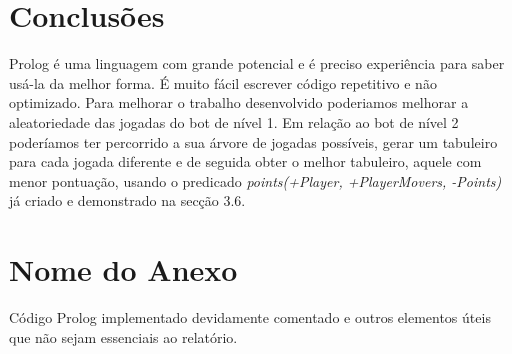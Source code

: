 \documentclass[a4paper]{article}
\begin{document}
\section{Conclusões}
Prolog é uma linguagem com grande potencial e é preciso experiência para saber usá-la da melhor forma. É muito fácil escrever código repetitivo e não optimizado.
Para melhorar o trabalho desenvolvido poderiamos melhorar a aleatoriedade das jogadas do bot de nível 1. Em relação ao bot de nível 2 poderíamos ter percorrido a sua árvore de jogadas possíveis, gerar um tabuleiro para cada jogada diferente e de seguida obter o melhor tabuleiro, aquele com menor pontuação, usando o predicado \textit{points(+Player, +PlayerMovers, -Points)}  já criado e demonstrado na secção 3.6.


\clearpage
{}
\renewcommand\refname{Bibliografia}



\newpage
\appendix
\section{Nome do Anexo}
Código Prolog implementado devidamente comentado e outros elementos úteis que não sejam essenciais ao relatório.
\end{document}
